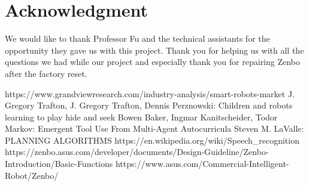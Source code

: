\documentclass[conference]{IEEEtran}
\begin{document}
\section*{Acknowledgment}
We would like to thank Professor Fu and the technical assistants for the opportunity they gave us with this project.
Thank you for helping us with all the questions we had while our project and especially thank you for repairing Zenbo after the factory reset.\\
\begin{thebibliography}{00}
	 https://www.grandviewresearch.com/industry-analysis/smart-robots-market
	 J. Gregory Trafton, J. Gregory Trafton, Dennis Perznowski: Children and robots learning to play hide and seek
	 Bowen Baker, Ingmar Kanitscheider, Todor Markov: Emergent Tool Use From Multi-Agent Autocurricula
   Steven M. LaValle: PLANNING ALGORITHMS
   https://en.wikipedia.org/wiki/Speech\_recognition
   https://zenbo.asus.com/developer/documents/Design-Guideline/Zenbo-Introduction/Basic-Functions
   https://www.asus.com/Commercial-Intelligent-Robot/Zenbo/
\end{thebibliography}
\vspace{12pt}
\end{document}

